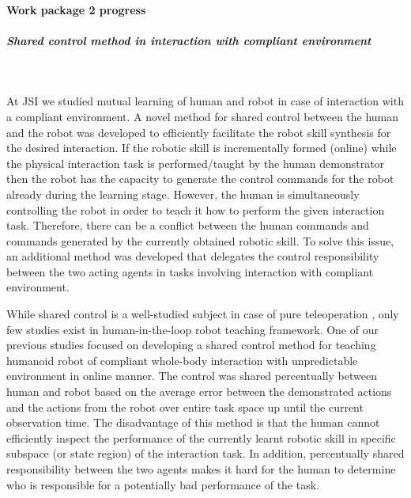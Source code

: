 \paragraph{Work package 2 progress}

\subparagraph{Shared control method in interaction with compliant environment}
~\par
At JSI we studied mutual learning of human and robot in case of interaction with a compliant environment. A novel method for shared control between the human and the robot was developed to efficiently facilitate the robot skill synthesis for the desired interaction. If the robotic skill is incrementally formed (online) while the physical interaction task is performed/taught by the human demonstrator then the robot has the capacity to generate the control commands for the robot already during the learning stage. However, the human is simultaneously controlling the robot in order to teach it how to perform the given interaction task. Therefore, there can be a conflict between the human commands and commands generated by the currently obtained robotic skill. To solve this issue, an additional method was developed that delegates the control responsibility between the two acting agents in tasks involving interaction with compliant environment.

While shared control is a well-studied subject in case of pure teleoperation \cite{Niemeyer2008}, only few studies exist in human-in-the-loop robot teaching framework. One of our previous studies \cite{Peternel2013} focused on developing a shared control method for teaching humanoid robot of compliant whole-body interaction with unpredictable environment in online manner. The control was shared percentually between human and robot based on the average error between the demonstrated actions and the actions from the robot over entire task space up until the current observation time. The disadvantage of this method is that the human cannot efficiently inspect the performance of the currently learnt robotic skill in specific subspace (or state region) of the interaction task. In addition, percentually shared responsibility between the two agents makes it hard for the human to determine who is responsible for a potentially bad performance of the task.

